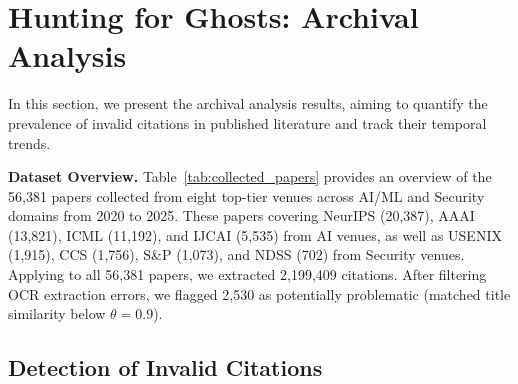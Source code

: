 \section{Hunting for Ghosts: Archival Analysis}
\label{sec:archival_results}

In this section, we present the archival analysis results, aiming to quantify the prevalence of invalid citations in published literature and track their temporal trends.

\noindent
\textbf{Dataset Overview.}
Table~\ref{tab:collected_papers} provides an overview of the 56,381 papers collected from eight top-tier venues across AI/ML and Security domains from 2020 to 2025. These papers covering NeurIPS (20,387), AAAI (13,821), ICML (11,192), and IJCAI (5,535) from AI venues, as well as USENIX (1,915), CCS (1,756), S\&P (1,073), and NDSS (702) from Security venues. Applying \citeb to all 56,381 papers, we extracted 2,199,409 citations. After filtering OCR extraction errors, we flagged 2,530 as potentially problematic (matched title similarity below $\theta = 0.9$).



\subsection{Detection of Invalid Citations}


